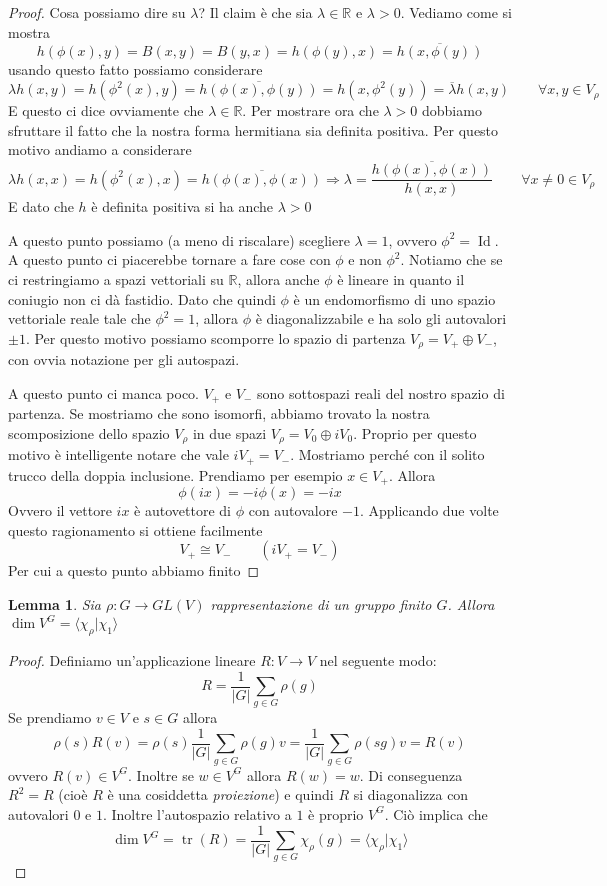 \documentclass[11pt]{article}
\theoremstyle{plain}
\newtheorem{lemma}[thm]{Lemma}
\theoremstyle{definition}
\theoremstyle{remark}
\newcommand{\R}{\mathbb{R}}
\DeclareMathOperator{\tr}{tr}
\DeclareMathOperator{\Id}{Id}
\begin{document}
\begin{proof}
Cosa possiamo dire su $\lambda$? Il claim è che sia $\lambda \in \R$ e $\lambda > 0$. Vediamo come si mostra
\[h(\phi(x), y) = B(x, y) = B(y, x) = h(\phi(y), x) = \overline{h(x, \phi(y))} \]
usando questo fatto possiamo considerare
\[ \lambda h(x, y) = h(\phi^2(x), y) = \overline{h(\phi(x), \phi(y))} = h(x, \phi^2(y)) = \overline{\lambda} h(x, y) \qquad \forall x, y \in V_\rho\]
E questo ci dice ovviamente che $\lambda \in \R$. Per mostrare ora che $\lambda > 0$ dobbiamo sfruttare il fatto che la nostra forma hermitiana sia definita positiva. Per questo motivo andiamo a considerare
\[\lambda h(x, x) = h (\phi^2(x), x) = \overline{h(\phi(x), \phi(x))} \Rightarrow \lambda = \dfrac{\overline{h(\phi(x), \phi(x))}}{ h(x,x)} \qquad \forall x \neq 0 \in V_\rho\]
E dato che $h $ è definita positiva si ha anche $\lambda > 0$

A questo punto possiamo (a meno di riscalare) scegliere $\lambda = 1$, ovvero $\phi^2 = \Id$. A questo punto ci piacerebbe tornare a fare cose con $\phi$ e non $\phi^2$. Notiamo che se ci restringiamo a spazi vettoriali su $\R$, allora anche $\phi$ è lineare in quanto il coniugio non ci dà fastidio. Dato che quindi $\phi$ è un endomorfismo di uno spazio vettoriale reale tale che $\phi^2=1$, allora $\phi$ è diagonalizzabile e ha solo gli autovalori $\pm 1$.  Per questo motivo possiamo scomporre lo spazio di partenza $V_\rho = V_+ \oplus V_-$, con ovvia notazione per gli autospazi.

A questo punto ci manca poco. $V_+$ e $V_-$ sono sottospazi reali del nostro spazio di partenza. Se mostriamo che sono isomorfi, abbiamo trovato la nostra scomposizione dello spazio $V_\rho$ in due spazi $V_\rho = V_0 \oplus iV_0$.
Proprio per questo motivo è intelligente notare che vale $i V_+ = V_-$.
Mostriamo perché con il solito trucco della doppia inclusione. Prendiamo per esempio $x \in V_+$. Allora
\[ \phi(ix) = - i \phi(x) = -i x \]
Ovvero il vettore $ix$ è autovettore di $\phi$ con autovalore $-1$. Applicando due volte questo ragionamento si ottiene facilmente
\[ V_+ \cong V_- \qquad (i V_+ = V_-)\]
Per cui a questo punto abbiamo finito
\end{proof}


\begin{lemma}
Sia $\rho:G\to GL(V)$ rappresentazione di un gruppo finito $G$. Allora $\dim V^G = \langle\chi_\rho|\chi_1\rangle$
\end{lemma}
\begin{proof}
Definiamo un'applicazione lineare $R:V\to V$ nel seguente modo:
\[ R = \frac{1}{|G|} \sum_{g\in G}{\rho(g)} \]
Se prendiamo $v\in V$ e $s\in G$ allora
\[ \rho(s) R(v) = \rho(s)\frac{1}{|G|} \sum_{g\in G}{\rho(g)v} = \frac{1}{|G|} \sum_{g\in G}{\rho(sg)v} = R(v)\]
ovvero $R(v)\in V^G$.
Inoltre se $w\in V^G$ allora $R(w)=w$. Di conseguenza $R^2 = R$ (cioè $R$ è una cosiddetta \emph{proiezione})
e quindi $R$ si diagonalizza con autovalori $0$ e $1$. Inoltre l'autospazio relativo a $1$ è proprio $V^G$.
Ciò implica che
\[ \dim V^G = \tr(R) = \frac{1}{|G|} \sum_{g\in G}{\chi_\rho(g)} = \langle\chi_\rho|\chi_1\rangle \]
\end{proof}
\end{document}
